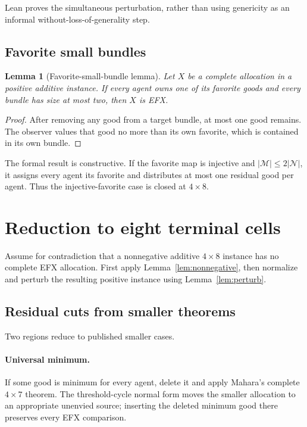 \documentclass[11pt]{article}
\newtheorem{lemma}[theorem]{Lemma}
\theoremstyle{definition}
\newcommand{\N}{\mathcal{N}}
\newcommand{\M}{\mathcal{M}}
\begin{document}
Lean proves the simultaneous perturbation, rather than using genericity as an
informal without-loss-of-generality step.

\subsection{Favorite small bundles}

\begin{lemma}[Favorite-small-bundle lemma]\label{lem:favorites}
Let $X$ be a complete allocation in a positive additive instance. If every
agent owns one of its favorite goods and every bundle has size at most two,
then $X$ is EFX.
\end{lemma}

\begin{proof}
After removing any good from a target bundle, at most one good remains. The
observer values that good no more than its own favorite, which is contained
in its own bundle.
\end{proof}

The formal result is constructive. If the favorite map is injective and
$|\M|\le2|\N|$, it assigns every agent its favorite and distributes at most
one residual good per agent. Thus the injective-favorite case is closed at
$4\times8$.

\section{Reduction to eight terminal cells}\label{sec:reduction}

Assume for contradiction that a nonnegative additive $4\times8$ instance has
no complete EFX allocation. First apply Lemma~\ref{lem:nonnegative}, then
normalize and perturb the resulting positive instance using
Lemma~\ref{lem:perturb}.

\subsection{Residual cuts from smaller theorems}

Two regions reduce to published smaller cases.

\paragraph{Universal minimum.}
If some good is minimum for every agent, delete it and apply Mahara's
complete $4\times7$ theorem. The threshold-cycle normal form moves the
smaller allocation to an appropriate unenvied source; inserting the deleted
minimum good there preserves every EFX comparison.
\end{document}

